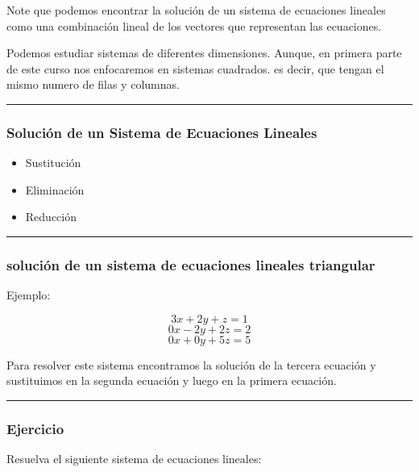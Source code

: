 \documentclass[
  letterpaper,
  DIV=11,
  numbers=noendperiod]{scrartcl}
\providecommand{\tightlist}{%
  \setlength{\itemsep}{0pt}\setlength{\parskip}{0pt}}\usepackage{longtable,booktabs,array}
\begin{document}
Note que podemos encontrar la solución de un sistema de ecuaciones
lineales como una combinación lineal de los vectores que representan las
ecuaciones.

Podemos estudiar sistemas de diferentes dimensiones. Aunque, en primera
parte de este curso nos enfocaremos en sistemas cuadrados. es decir, que
tengan el mismo numero de filas y columnas.

\begin{center}\rule{0.5\linewidth}{0.5pt}\end{center}

\subsubsection{Solución de un Sistema de Ecuaciones
Lineales}\label{soluciuxf3n-de-un-sistema-de-ecuaciones-lineales}

\begin{itemize}
\tightlist
\item
  Sustitución
\item
  Eliminación
\item
  Reducción
\end{itemize}

\begin{center}\rule{0.5\linewidth}{0.5pt}\end{center}

\subsubsection{solución de un sistema de ecuaciones lineales
triangular}\label{soluciuxf3n-de-un-sistema-de-ecuaciones-lineales-triangular}

Ejemplo:

\[  3x + 2y + z = 1 \] \[  0x - 2y + 2z = 2 \] \[  0x + 0y + 5z = 5 \]

Para resolver este sistema encontramos la solución de la tercera
ecuación y sustituimos en la segunda ecuación y luego en la primera
ecuación.

\begin{center}\rule{0.5\linewidth}{0.5pt}\end{center}

\subsubsection{Ejercicio}\label{ejercicio}

Resuelva el siguiente sistema de ecuaciones lineales:
\end{document}
